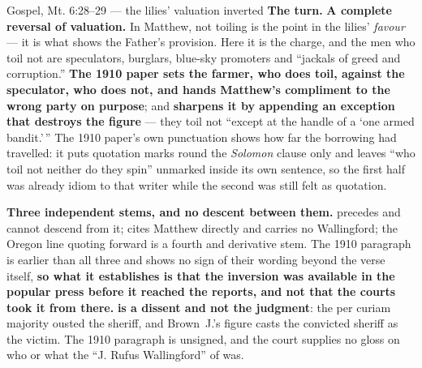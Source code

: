 \begin{afterlife}{Gospel, Mt. 6:28--29 --- the lilies' valuation inverted}
\textbf{The turn.} \textbf{A complete reversal of valuation.} In Matthew, not
toiling is the point in the lilies' \emph{favour} --- it is what shows the
Father's provision. Here it is the charge, and the men who toil not are
speculators, burglars, blue-sky promoters and ``jackals of greed and
corruption.'' \textbf{The 1910 paper sets the farmer, who does toil, against the
speculator, who does not, and hands Matthew's compliment to the wrong party on
purpose}; and \textbf{ sharpens it by appending an exception that
destroys the figure} --- they toil not ``except at the handle of a `one armed
bandit.'\,'' The 1910 paper's own punctuation shows how far the borrowing had
travelled: it puts quotation marks round the \emph{Solomon} clause only and
leaves ``who toil not neither do they spin'' unmarked inside its own sentence,
so the first half was already idiom to that writer while the second was still
felt as quotation.

\textbf{Three independent stems, and no descent between them.} 
precedes  and cannot descend from it;  cites
Matthew directly and carries no Wallingford; the Oregon line quoting
 forward is a fourth and derivative stem. The 1910 paragraph is
earlier than all three and shows no sign of their wording beyond the verse
itself, \textbf{so what it establishes is that the inversion was available in
the popular press before it reached the reports, and not that the courts took it
from there.} \textbf{ is a dissent and not the judgment}: the per
curiam majority ousted the sheriff, and Brown~J.'s figure casts the convicted
sheriff as the victim. The 1910 paragraph is unsigned, and the court supplies
no gloss on who or what the ``J. Rufus Wallingford'' of  was.
\end{afterlife}

\clearpage
